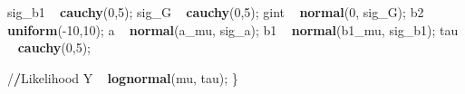 \documentclass[12pt,]{article}
\newenvironment{Shaded}{\begin{snugshade}}{\end{snugshade}}
\newcommand{\KeywordTok}[1]{\textcolor[rgb]{0.13,0.29,0.53}{\textbf{{#1}}}}
\newcommand{\DecValTok}[1]{\textcolor[rgb]{0.00,0.00,0.81}{{#1}}}
\newcommand{\StringTok}[1]{\textcolor[rgb]{0.31,0.60,0.02}{{#1}}}
\newcommand{\ErrorTok}[1]{\textbf{{#1}}}
\newcommand{\NormalTok}[1]{{#1}}
\begin{document}
\begin{Shaded}
\begin{Highlighting}[]
  \NormalTok{sig_b1 ~}\StringTok{ }\KeywordTok{cauchy}\NormalTok{(}\DecValTok{0}\NormalTok{,}\DecValTok{5}\NormalTok{);}
  \NormalTok{sig_G ~}\StringTok{ }\KeywordTok{cauchy}\NormalTok{(}\DecValTok{0}\NormalTok{,}\DecValTok{5}\NormalTok{);}
  \NormalTok{gint ~}\StringTok{ }\KeywordTok{normal}\NormalTok{(}\DecValTok{0}\NormalTok{, sig_G);}
  \NormalTok{b2 ~}\StringTok{ }\KeywordTok{uniform}\NormalTok{(-}\DecValTok{10}\NormalTok{,}\DecValTok{10}\NormalTok{);}
  \NormalTok{a ~}\StringTok{ }\KeywordTok{normal}\NormalTok{(a_mu, sig_a);}
  \NormalTok{b1 ~}\StringTok{ }\KeywordTok{normal}\NormalTok{(b1_mu, sig_b1);}
  \NormalTok{tau ~}\StringTok{ }\KeywordTok{cauchy}\NormalTok{(}\DecValTok{0}\NormalTok{,}\DecValTok{5}\NormalTok{);}

  \NormalTok{/}\ErrorTok{/}\NormalTok{Likelihood}
  \NormalTok{Y ~}\StringTok{ }\KeywordTok{lognormal}\NormalTok{(mu, tau);}
\NormalTok{\}}
\end{Highlighting}
\end{Shaded}
\end{document}
